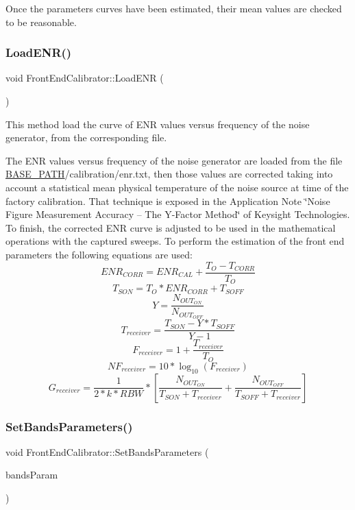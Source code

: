 Once the parameters\textquotesingle{} curves have been estimated, their mean values are checked to be reasonable. \mbox{\label{classFrontEndCalibrator_af166e90f4fe0dfd7cdf825b88d33a479}} 
\subsubsection{\texorpdfstring{Load\+E\+N\+R()}{LoadENR()}}
{\footnotesize\ttfamily void Front\+End\+Calibrator\+::\+Load\+E\+NR (\begin{DoxyParamCaption}{ }\end{DoxyParamCaption})}



This method load the curve of E\+NR values versus frequency of the noise generator, from the corresponding file. 

The E\+NR values versus frequency of the noise generator are loaded from the file \hyperlink{Basics_8h_a0423f4cb393331ce0b9f6b3a43adcaae}{B\+A\+S\+E\+\_\+\+P\+A\+TH}/calibration/enr.txt, then those values are corrected taking into account a statistical mean physical temperature of the noise source at time of the factory calibration. That technique is exposed in the Application Note \char`\"{}\+Noise Figure Measurement Accuracy – The Y-\/\+Factor Method\char`\"{} of Keysight Technologies. To finish, the corrected E\+NR curve is adjusted to be used in the mathematical operations with the captured sweeps. To perform the estimation of the front end parameters the following equations are used\+: \[ ENR_{CORR}=ENR_{CAL}+\frac{T_{O}-T_{CORR}}{T_{O}} \] \[ T_{SON}=T_{O}*ENR_{CORR}+T_{SOFF} \] \[ Y=\frac{N_{OUT_{ON}}}{N_{OUT_{OFF}}} \] \[ T_{receiver}=\frac{T_{SON}-Y*T_{SOFF}}{Y-1} \] \[ F_{receiver}=1+\frac{T_{receiver}}{T_O} \] \[ NF_{receiver}=10*\log_{10}(F_{receiver}) \] \[ G_{receiver}=\frac{1}{2*k*RBW}*\left[\frac{N_{OUT_{ON}}}{T_{SON}+T_{receiver}}+\frac{N_{OUT_{OFF}}}{T_{SOFF}+T_{receiver}}\right] \] \mbox{\label{classFrontEndCalibrator_a6fcf8e8343878614d1b03910bb97a3d6}} 
\subsubsection{\texorpdfstring{Set\+Bands\+Parameters()}{SetBandsParameters()}}
{\footnotesize\ttfamily void Front\+End\+Calibrator\+::\+Set\+Bands\+Parameters (\begin{DoxyParamCaption}\item[{const std\+::vector$<$ \hyperlink{structBandParameters}{Band\+Parameters} $>$ \&}]{bands\+Param }\end{DoxyParamCaption})}



